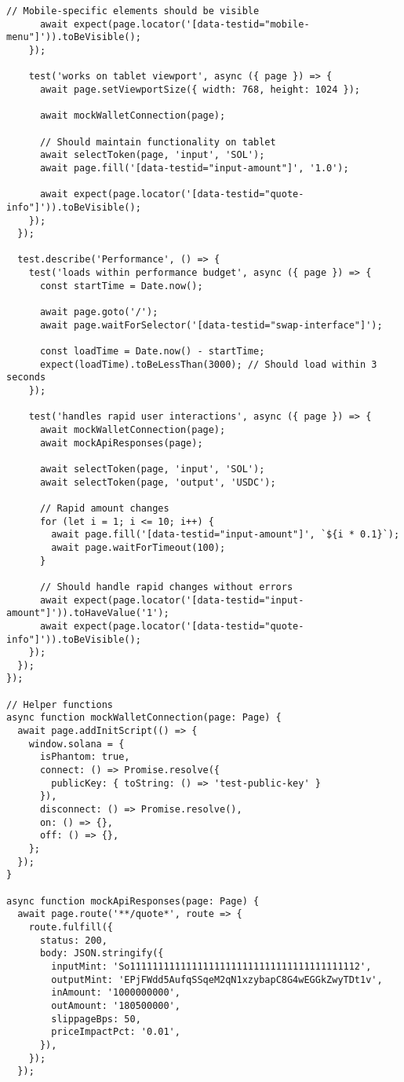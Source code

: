 \documentclass[11pt,a4paper]{article}
\begin{document}
\begin{lstlisting}[style=typescript, caption=E2E Test Implementation]
      // Mobile-specific elements should be visible
      await expect(page.locator('[data-testid="mobile-menu"]')).toBeVisible();
    });

    test('works on tablet viewport', async ({ page }) => {
      await page.setViewportSize({ width: 768, height: 1024 });
      
      await mockWalletConnection(page);

      // Should maintain functionality on tablet
      await selectToken(page, 'input', 'SOL');
      await page.fill('[data-testid="input-amount"]', '1.0');
      
      await expect(page.locator('[data-testid="quote-info"]')).toBeVisible();
    });
  });

  test.describe('Performance', () => {
    test('loads within performance budget', async ({ page }) => {
      const startTime = Date.now();
      
      await page.goto('/');
      await page.waitForSelector('[data-testid="swap-interface"]');
      
      const loadTime = Date.now() - startTime;
      expect(loadTime).toBeLessThan(3000); // Should load within 3 seconds
    });

    test('handles rapid user interactions', async ({ page }) => {
      await mockWalletConnection(page);
      await mockApiResponses(page);

      await selectToken(page, 'input', 'SOL');
      await selectToken(page, 'output', 'USDC');

      // Rapid amount changes
      for (let i = 1; i <= 10; i++) {
        await page.fill('[data-testid="input-amount"]', `${i * 0.1}`);
        await page.waitForTimeout(100);
      }

      // Should handle rapid changes without errors
      await expect(page.locator('[data-testid="input-amount"]')).toHaveValue('1');
      await expect(page.locator('[data-testid="quote-info"]')).toBeVisible();
    });
  });
});

// Helper functions
async function mockWalletConnection(page: Page) {
  await page.addInitScript(() => {
    window.solana = {
      isPhantom: true,
      connect: () => Promise.resolve({
        publicKey: { toString: () => 'test-public-key' }
      }),
      disconnect: () => Promise.resolve(),
      on: () => {},
      off: () => {},
    };
  });
}

async function mockApiResponses(page: Page) {
  await page.route('**/quote*', route => {
    route.fulfill({
      status: 200,
      body: JSON.stringify({
        inputMint: 'So11111111111111111111111111111111111111112',
        outputMint: 'EPjFWdd5AufqSSqeM2qN1xzybapC8G4wEGGkZwyTDt1v',
        inAmount: '1000000000',
        outAmount: '180500000',
        slippageBps: 50,
        priceImpactPct: '0.01',
      }),
    });
  });


\end{lstlisting}
\end{document}

